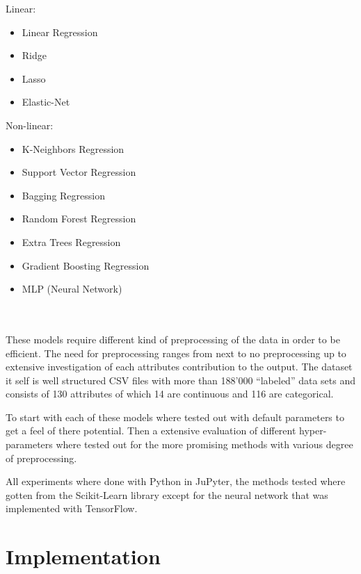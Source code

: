 \documentclass[a4paper]{article}
\begin{document}
\begin{varwidth}[t]{.5\textwidth}
    Linear:
    \begin{itemize}
        \item Linear Regression
        \item Ridge
        \item Lasso
        \item Elastic-Net
    \end{itemize}
\end{varwidth}
\hspace{4em}
\begin{varwidth}[t]{.5\textwidth}
    Non-linear:
    \begin{itemize}
        \item K-Neighbors Regression
        \item Support Vector Regression
        \item Bagging Regression
        \item Random Forest Regression
        \item Extra Trees Regression
        \item Gradient Boosting Regression
        \item MLP (Neural Network)
    \end{itemize}
\end{varwidth} \\\\
These models require different kind of preprocessing of the data in order to be efficient. The need for preprocessing ranges from next to no preprocessing up to extensive investigation of each attributes contribution to the output. The dataset it self is well structured CSV files with more than 188’000 “labeled” data sets and consists of 130 attributes of which 14 are continuous and 116 are categorical.

To start with each of these models where tested out with default parameters to get a feel of there potential. Then a extensive evaluation of different hyper-parameters where tested out for the more promising methods with various degree of preprocessing.

All experiments where done with Python in JuPyter, the methods tested where gotten from the Scikit-Learn library except for the neural network that was implemented with TensorFlow.


\section{Implementation}
\end{document}
